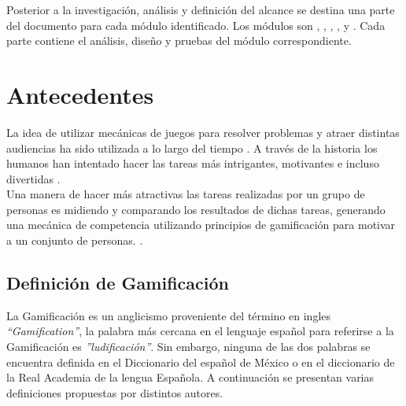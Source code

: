  \noindent Posterior a la investigación, análisis y definición del alcance se destina
 una parte del documento para cada módulo identificado. Los módulos son ,
 , , ,  y
 . Cada parte contiene el análisis, diseño y pruebas del módulo
 correspondiente.

 \clearpage

\section{Antecedentes} \label{sec:antecedentes}

 La idea de utilizar mecánicas de juegos para resolver problemas y atraer
 distintas audiencias ha sido utilizada a lo largo del tiempo \cite{GamByDesign}.
 A través de la historia los humanos han intentado hacer las tareas más
 intrigantes, motivantes e incluso divertidas \cite{Octalysis}.\\

 \noindent Una manera de hacer más atractivas las tareas realizadas por un grupo
 de personas es midiendo y comparando los resultados de dichas tareas, generando
 una mecánica de competencia utilizando principios de gamificación para motivar
 a un conjunto de personas. \cite[p. 7]{Octalysis}.

\subsection{Definición de Gamificación}

 La Gamificación es un anglicismo proveniente del término en ingles {\it ``Gamification''},
 la palabra más cercana en el lenguaje español para referirse a la Gamificación
 es {\it ''ludificación''}. Sin embargo, ninguna de las dos palabras se encuentra
 definida en el Diccionario del español de México o en el diccionario de la Real
 Academia de la lengua Española. A continuación se presentan varias definiciones
 propuestas por distintos autores.

